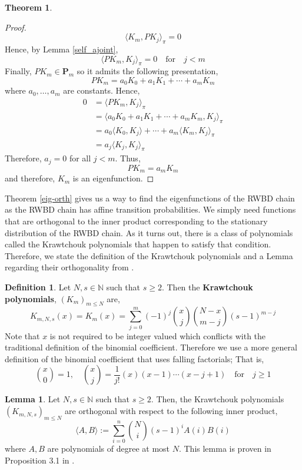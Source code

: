 \documentclass{article}
\theoremstyle{definition}
\newtheorem{definition}{Definition}
\theoremstyle{definition}
\newtheorem{theorem}{Theorem}
\theoremstyle{definition}
\newtheorem{lemma}{Lemma}
\theoremstyle{definition}
\theoremstyle{named}
\begin{document}
\begin{theorem}
\begin{proof}
   \[\langle K_m, PK_j \rangle_\pi = 0\]
   Hence, by Lemma \ref{self_ajoint},
   \[\langle PK_m, K_j\rangle_\pi=0 \quad \text{for}\quad j<m\]
   Finally, $PK_m \in \mathbf{P}_m$ so it admits the following presentation,
   \[PK_m = a_0 K_0 + a_1 K_1 + \cdots + a_m K_m\]
   where $a_0,\dots, a_m$ are constants. Hence,
   \begin{align*}
   0&= \langle PK_m, K_j\rangle_\pi\\
   &= \langle a_0 K_0 + a_1 K_1 + \cdots + a_m K_m, K_j\rangle_\pi\\
   &= a_0\langle K_0, K_j\rangle + \cdots + a_m\langle K_m, K_j\rangle_\pi \tag{by linearity}\\
   &= a_j\langle K_j, K_j\rangle_\pi \tag{by orthogonality}
   \end{align*}
   Therefore, $a_j = 0$ for all $j<m$. Thus,
   \[PK_m = a_m K_m\]
   and therefore, $K_m$ is an eigenfunction.
   \end{proof} 
\end{theorem}
\noindent Theorem \ref{eig-orth} gives us a way to find the eigenfunctions of the RWBD chain as the RWBD chain has affine transition probabilities. We simply need functions that are orthogonal to the inner product corresponding to the stationary distribution of the RWBD chain. As it turns out, there is a class of polynomials called the Krawtchouk polynomials that happen to satisfy that condition. Therefore, we state the definition of the Krawtchouk polynomials and a Lemma regarding their orthogonality from \cite{coleman_krawtchouk_2011}.
\begin{definition}
   \label{krav_def}
   Let $N,s\in \mathbb{N}$ such that $s\geq 2$. Then the {\bf Krawtchouk polynomials}, $(K_m)_{m\leq N}$ are,
   \[K_{m,N,s}(x) = K_m(x) = \sum_{j=0}^m (-1)^j{x \choose j}{N-x\choose m-j}(s-1)^{m-j}\]
   Note that $x$ is not required to be integer valued which conflicts with the traditional definition of the binomial coefficient. Therefore we use a more general definition of the binomial coefficient that uses falling factorials; That is,
   \[{x \choose 0} = 1, \quad {x \choose j} = \frac{1}{j!}(x)(x-1)\cdots(x-j+1) \quad \text{for} \quad j\geq 1\]
\end{definition}
\begin{lemma}
   \label{krav_orth}
   Let $N,s\in \mathbb{N}$ such that $s\geq 2$. Then, the Krawtchouk polynomials $(K_{m,N,s})_{m\leq N}$ are orthogonal with respect to the following inner product,
   \[\langle A,B \rangle := \sum_{i=0}^n {N \choose i}(s-1)^iA(i) B(i)\]
   where $A,B$ are polynomials of degree at most $N$. This lemma is proven in Proposition 3.1 in \cite{coleman_krawtchouk_2011}.
\end{lemma}
\end{document}
